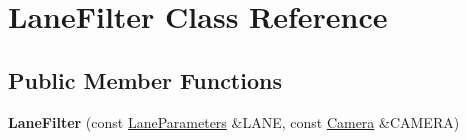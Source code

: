 \hypertarget{classLaneFilter}{\section{Lane\-Filter Class Reference}
\label{classLaneFilter}
}
\subsection*{Public Member Functions}
\begin{DoxyCompactItemize}
\item 
\hypertarget{classLaneFilter_a05e9cf021b1020079d98b61278d78fe2}{{\bfseries Lane\-Filter} (const \hyperlink{structLaneParameters}{Lane\-Parameters} \&L\-A\-N\-E, const \hyperlink{structCamera}{Camera} \&C\-A\-M\-E\-R\-A)}\label{classLaneFilter_a05e9cf021b1020079d98b61278d78fe2}

\end{DoxyCompactItemize}
